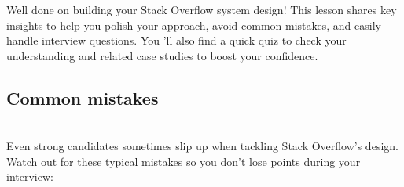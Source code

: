 

Well done on building your Stack Overflow system design! This lesson shares key insights to help you polish your approach, avoid common mistakes, and easily handle interview questions. You 'll also find a quick quiz to check your understanding and related case studies to boost your confidence.

\subsection{Common mistakes}\label{dnBPAYV-RiCcGpXM4f7NV}
\\
Even strong candidates sometimes slip up when tackling Stack Overflow's design. Watch out for these typical mistakes so you don't lose points during your interview:

